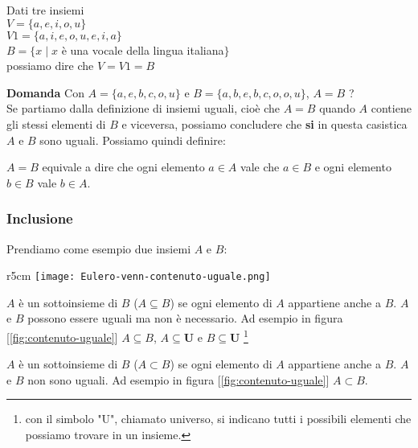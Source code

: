 \begin{example}
	Dati tre insiemi
	\\$V = \{a, e, i, o, u\}$
	\\$V1 = \{a, i, e, o, u, e, i, a\}$
	\\$B = \{x \mid x$ è una vocale della lingua italiana$\}$
	\\possiamo dire che $V = V1 = B$
\end{example}

\textbf{Domanda} Con $A = \{a, e, b, c, o, u\}$ e $B = \{a, b, e, b, c, o, o, u\}$, $A = B$ ?\\
Se partiamo dalla definizione di insiemi uguali, cioè che $A = B$ quando $A$ contiene gli stessi elementi di $B$ e viceversa, possiamo concludere che \textbf{si} in questa casistica $A$ e $B$ sono uguali. Possiamo quindi definire:
\begin{definition}
	$A = B$ equivale a dire che ogni elemento $a \in A$ vale che $a \in B$ e ogni elemento $b \in B$ vale $b \in A$.
\end{definition}

\subsubsection{Inclusione}
Prendiamo come esempio due insiemi $A$ e $B$:
\begin{wrapfigure}{r}{5cm}
    \texttt{[image: Eulero-venn-contenuto-uguale.png]}
    \caption{Contenuto uguale}
    \label{fig:contenuto-uguale}
\end{wrapfigure}
\begin{definition}[Sottoinsieme]
	$A$ è un sottoinsieme di $B$ ($A \subseteq B$) se ogni elemento di $A$ appartiene anche a $B$. $A$ e $B$ possono essere uguali ma non è necessario. Ad esempio in figura [\ref{fig:contenuto-uguale}] $A \subseteq B$, $A \subseteq \mathbf{U}$ e $B \subseteq \mathbf{U}$ \footnote{con il simbolo "U", chiamato universo, si indicano tutti i possibili elementi che possiamo trovare in un insieme.}
\end{definition}

\begin{definition}
	$A$ è un sottoinsieme di $B$ ($A \subset B$) se ogni elemento di $A$ appartiene anche a $B$. $A$ e $B$ non sono uguali. Ad esempio in figura [\ref{fig:contenuto-uguale}] $A \subset B$.
\end{definition}

